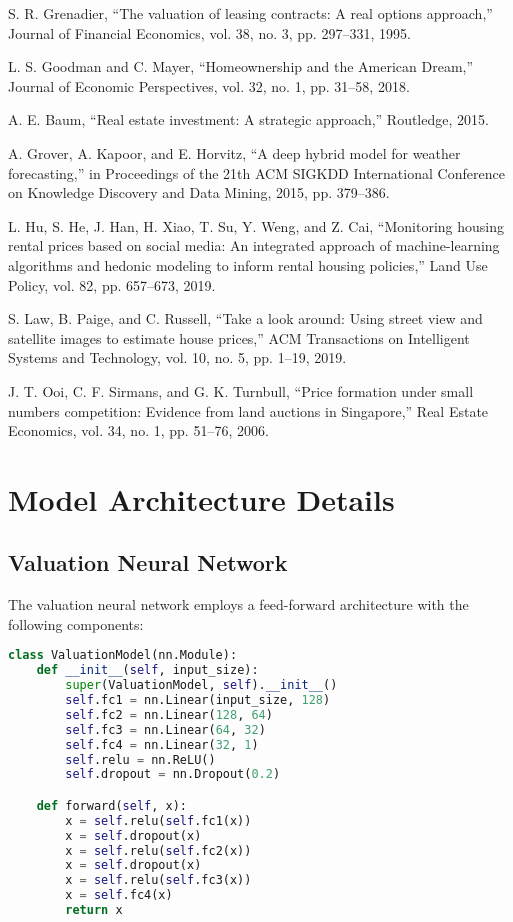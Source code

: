 \documentclass[conference]{IEEEtran}
\begin{document}
\begin{thebibliography}{00}
 S. R. Grenadier, ``The valuation of leasing contracts: A real options approach,'' Journal of Financial Economics, vol. 38, no. 3, pp. 297--331, 1995.

 L. S. Goodman and C. Mayer, ``Homeownership and the American Dream,'' Journal of Economic Perspectives, vol. 32, no. 1, pp. 31--58, 2018.

 A. E. Baum, ``Real estate investment: A strategic approach,'' Routledge, 2015.

 A. Grover, A. Kapoor, and E. Horvitz, ``A deep hybrid model for weather forecasting,'' in Proceedings of the 21th ACM SIGKDD International Conference on Knowledge Discovery and Data Mining, 2015, pp. 379--386.

 L. Hu, S. He, J. Han, H. Xiao, T. Su, Y. Weng, and Z. Cai, ``Monitoring housing rental prices based on social media: An integrated approach of machine-learning algorithms and hedonic modeling to inform rental housing policies,'' Land Use Policy, vol. 82, pp. 657--673, 2019.

 S. Law, B. Paige, and C. Russell, ``Take a look around: Using street view and satellite images to estimate house prices,'' ACM Transactions on Intelligent Systems and Technology, vol. 10, no. 5, pp. 1--19, 2019.

 J. T. Ooi, C. F. Sirmans, and G. K. Turnbull, ``Price formation under small numbers competition: Evidence from land auctions in Singapore,'' Real Estate Economics, vol. 34, no. 1, pp. 51--76, 2006.

\end{thebibliography}

\appendix

\section{Model Architecture Details}

\subsection{Valuation Neural Network}
The valuation neural network employs a feed-forward architecture with the following components:

\begin{lstlisting}[language=Python, caption=Valuation Neural Network Architecture]
class ValuationModel(nn.Module):
    def __init__(self, input_size):
        super(ValuationModel, self).__init__()
        self.fc1 = nn.Linear(input_size, 128)
        self.fc2 = nn.Linear(128, 64)
        self.fc3 = nn.Linear(64, 32)
        self.fc4 = nn.Linear(32, 1)
        self.relu = nn.ReLU()
        self.dropout = nn.Dropout(0.2)

    def forward(self, x):
        x = self.relu(self.fc1(x))
        x = self.dropout(x)
        x = self.relu(self.fc2(x))
        x = self.dropout(x)
        x = self.relu(self.fc3(x))
        x = self.fc4(x)
        return x
\end{lstlisting}
\end{document}
